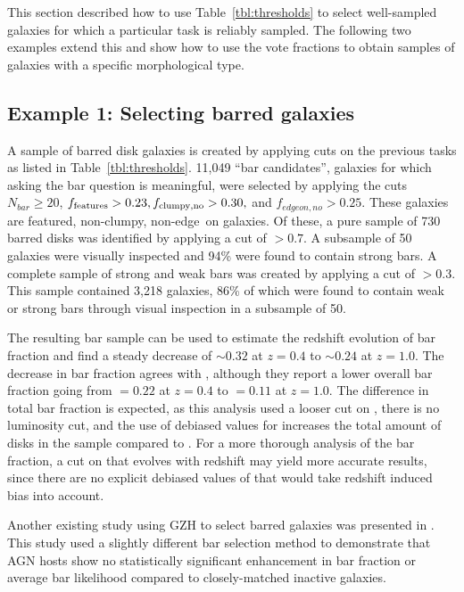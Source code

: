 \documentclass[twocolumn]{aastex6}
\begin{document}
This section described how to use Table~\ref{tbl:thresholds} to select
well-sampled galaxies for which a particular task is reliably sampled. The
following two examples extend this and show how to use the vote fractions to
obtain samples of galaxies with a specific morphological type.

\subsection{Example 1: Selecting barred galaxies} 

A sample of barred disk galaxies is created by applying cuts on the previous
tasks as listed in Table~\ref{tbl:thresholds}. 11,049 ``bar candidates'',
galaxies for which asking the bar question is meaningful, were selected by
applying the cuts $N_{bar} \ge 20$, $f_{\rm features}>0.23, f_{\rm clumpy,no} >
0.30,$ and $f_{edgeon,no}>0.25$. These galaxies are featured, non-clumpy,
non-edge~on galaxies. Of these, a pure sample of 730 barred disks was
identified by applying a cut of \fbar$>0.7$. A subsample of 50 galaxies were
visually inspected and 94\% were found to contain strong bars. A complete
sample of strong and weak bars was created by applying a cut of \fbar$>0.3$.
This sample contained 3,218 galaxies, 86\% of which were found to contain weak
or strong bars through visual inspection in a subsample of 50.

The resulting bar sample can be used to estimate the redshift evolution of bar
fraction and find a steady decrease of \fbar$\sim 0.32$ at $z=0.4$ to
\fbar$\sim 0.24$ at $z=1.0$. The decrease in bar fraction agrees with
\citet{mel14}, although they report a lower overall bar fraction going from
\fbar$=0.22$ at $z=0.4$ to \fbar$=0.11$ at $z=1.0$. The difference in total bar
fraction is expected, as this analysis used a looser cut on \fbar, there is no
luminosity cut, and the use of debiased values for \ffeatures{} increases the
total amount of disks in the sample compared to \citet{mel14}. For a more
thorough analysis of the bar fraction, a cut on \fbar{} that evolves with
redshift may yield more accurate results, since there are no explicit debiased
values of \fbar{} that would take redshift induced bias into account. 

Another existing study using GZH to select barred galaxies was presented in
\citet{che15}. This study used a slightly different bar selection method to
demonstrate that AGN hosts show no statistically significant enhancement in bar
fraction or average bar likelihood compared to closely-matched inactive
galaxies. 
\end{document}
